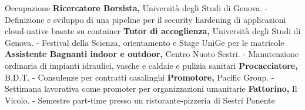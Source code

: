 \begin{rubric}{Occupazione}
\entry*[07/2024 -- 10/2025]%
	\textbf{Ricercatore Borsista,} Università degli Studi di Genova.\newline
    - Definizione e sviluppo di una pipeline per il security hardening di applicazioni cloud-native basate su container 
%
\entry*[2023 -- 2024]%
	\textbf{Tutor di accoglienza,} Università degli Studi di Genova.\newline
    -  Festival della Scienza, orientamento e Stage UniGe per le matricole
%
\entry*[2018 -- present]%
	\textbf{Assistente Bagnanti indoor e outdoor,}  Centro Nuoto Sestri.\newline
    - Manutenzione ordinaria di impianti idraulici, vasche e caldaie e pulizia sanitari
%
%
\entry*[2020]%
	\textbf{Procacciatore,} B.D.T.\newline
    - Consulenze per contratti casalinghi
%
\entry*[2020 ]%
	\textbf{Promotore,} Pacific Group.\newline
    - Settimana lavorativa come promoter per organizzazioni umanitarie
%
\entry*[2019 -- 2020]%
	\textbf{Fattorino,} Il Vicolo.\newline
    - Semestre part-time presso un ristorante-pizzeria di Sestri Ponente
%
\end{rubric}